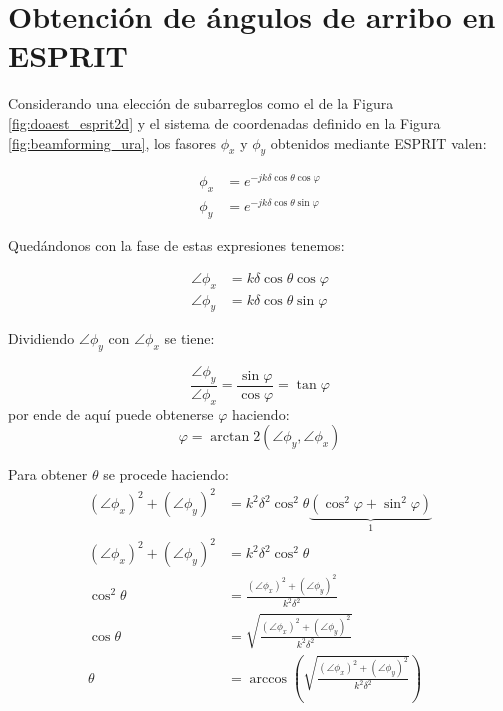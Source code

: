 \chapter{Obtención de ángulos de arribo en ESPRIT}\label{AP:esprit_angles}

Considerando una elección de subarreglos como el de la Figura \ref{fig:doaest_esprit2d} y el sistema de coordenadas definido en la Figura \ref{fig:beamforming_ura}, los fasores $\phi_x$ y $\phi_y$ obtenidos mediante ESPRIT valen:

\begin{equation}
    \begin{aligned}
        \phi_x & = e^{-jk\delta\cos\theta \cos\varphi}  \\
        \phi_y & = e^{-jk\delta\cos\theta \sin \varphi}
    \end{aligned}
\end{equation}

Quedándonos con la fase de estas expresiones tenemos:

\begin{equation}
    \begin{aligned}
        \angle\phi_x & = k\delta\cos\theta \cos\varphi  \\
        \angle\phi_y & = k\delta\cos\theta \sin \varphi
    \end{aligned}
\end{equation}

Dividiendo $\angle\phi_y$ con $\angle\phi_x$ se tiene:

\begin{equation}
    \frac{\angle\phi_y}{\angle\phi_x} = \frac{\sin\varphi}{\cos \varphi} = \tan\varphi
\end{equation}
por ende de aquí puede obtenerse $\varphi$ haciendo:
\begin{equation}
    \varphi = \arctan2(\angle\phi_y,\angle\phi_x)
\end{equation}

Para obtener $\theta$ se procede haciendo:
\begin{align}
    (\angle\phi_x)^2 + (\angle\phi_y)^2 & = k^2 \delta^2 \cos^2 \theta \underbrace{\left(\cos^2 \varphi + \sin^2 \varphi \right)}_1\nonumber \\
    (\angle\phi_x)^2 + (\angle\phi_y)^2 & = k^2 \delta^2 \cos^2 \theta\nonumber                                                              \\
    \cos^2 \theta                       & = \frac{(\angle\phi_x)^2 + (\angle\phi_y)^2}{k^2 \delta^2}\nonumber                                \\
    \cos \theta                         & = \sqrt{\frac{(\angle\phi_x)^2 + (\angle\phi_y)^2}{k^2 \delta^2}}\nonumber                         \\
    \theta                              & = \arccos\left(\sqrt{\frac{(\angle\phi_x)^2 + (\angle\phi_y)^2}{k^2 \delta^2}} \right)
\end{align}

